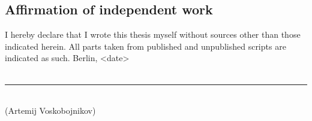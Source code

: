 \subsection*{Affirmation of independent work}
I hereby declare that I wrote this thesis myself without sources other than
those indicated herein. All parts taken from published and unpublished
scripts are indicated as such.
\parbig
Berlin, <date>
\\\\

\rule{120pt}{1pt}\\
(Artemij Voskobojnikov)